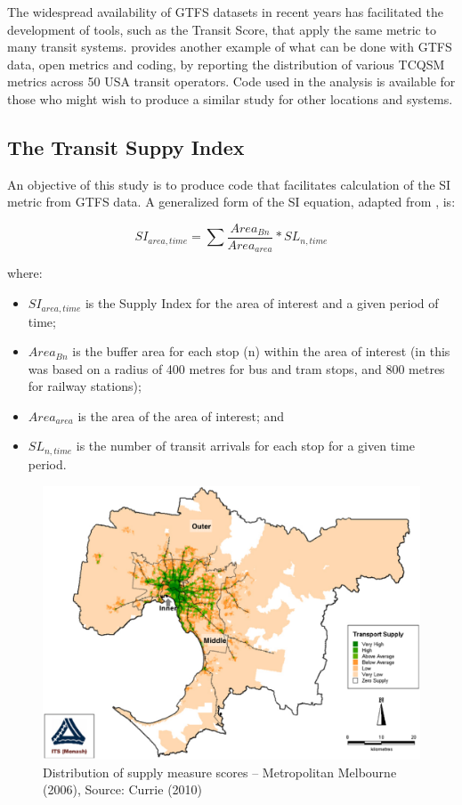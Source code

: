 \documentclass[preprint, 3p,
authoryear]{elsarticle} %
\begin{document}
The widespread availability of GTFS datasets in recent years has
facilitated the development of tools, such as the Transit Score, that
apply the same metric to many transit systems. \citet{Wong:2013aa}
provides another example of what can be done with GTFS data, open
metrics and coding, by reporting the distribution of various TCQSM
metrics across 50 USA transit operators. Code used in the
\citet{Wong:2013aa} analysis is available for those who might wish to
produce a similar study for other locations and systems.

\subsection{The Transit Suppy Index}\label{the-transit-suppy-index}

An objective of this study is to produce code that facilitates
calculation of the SI metric from GTFS data. A generalized form of the
SI equation, adapted from \citet{currie2010identifying}, is:

\[SI_{area, time} = \sum{\frac{Area_{Bn}}{Area_{area}}*SL_{n, time}}\]

where:

\begin{itemize}
\item
  \(SI_{area, time}\) is the Supply Index for the area of interest and a
  given period of time;
\item
  \(Area_{Bn}\) is the buffer area for each stop (n) within the area of
  interest (in \citet{currie2010identifying} this was based on a radius
  of 400 metres for bus and tram stops, and 800 metres for railway
  stations);
\item
  \(Area_{area}\) is the area of the area of interest; and
\item
  \(SL_{n,time}\) is the number of transit arrivals for each stop for a
  given time period.
\end{itemize}

\begin{figure}
\includegraphics[width=1\linewidth]{graphics/Currie2010SI} \caption{Distribution of supply measure scores – Metropolitan Melbourne (2006), Source: Currie (2010)}\label{fig:Currie_map_SI}
\end{figure}
\end{document}
